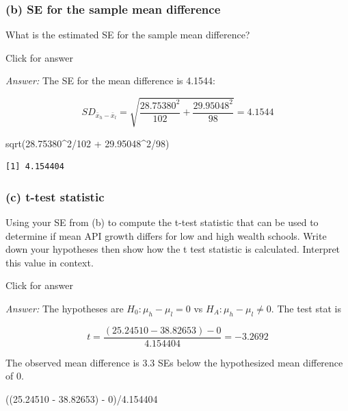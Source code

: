 \documentclass[
]{book}
\newenvironment{Shaded}{\begin{snugshade}}{\end{snugshade}}
\newcommand{\DecValTok}[1]{\textcolor[rgb]{0.00,0.00,0.81}{#1}}
\newcommand{\FloatTok}[1]{\textcolor[rgb]{0.00,0.00,0.81}{#1}}
\newcommand{\FunctionTok}[1]{\textcolor[rgb]{0.00,0.00,0.00}{#1}}
\newcommand{\NormalTok}[1]{#1}
\newcommand{\SpecialCharTok}[1]{\textcolor[rgb]{0.00,0.00,0.00}{#1}}
\begin{document}
\hypertarget{b-se-for-the-sample-mean-difference-1}{%
\subsubsection{(b) SE for the sample mean difference}\label{b-se-for-the-sample-mean-difference-1}}

What is the estimated SE for the sample mean difference?

Click for answer

\emph{Answer:} The SE for the mean difference is 4.1544:

\[
SD_{\bar{x}_h - \bar{x}_l} = \sqrt{\dfrac{28.75380^2}{102} + \dfrac{29.95048^2}{98}} = 4.1544
\]

\begin{Shaded}
\begin{Highlighting}[]
\FunctionTok{sqrt}\NormalTok{(}\FloatTok{28.75380}\SpecialCharTok{\^{}}\DecValTok{2}\SpecialCharTok{/}\DecValTok{102} \SpecialCharTok{+}  \FloatTok{29.95048}\SpecialCharTok{\^{}}\DecValTok{2}\SpecialCharTok{/}\DecValTok{98}\NormalTok{)}
\end{Highlighting}
\end{Shaded}

\begin{verbatim}
[1] 4.154404
\end{verbatim}

\hypertarget{c-t-test-statistic-3}{%
\subsubsection{(c) t-test statistic}\label{c-t-test-statistic-3}}

Using your SE from (b) to compute the t-test statistic that can be used to determine if mean API growth differs for low and high wealth schools. Write down your hypotheses then show how the t test statistic is calculated. Interpret this value in context.

Click for answer

\emph{Answer:} The hypotheses are \(H_0: \mu_h - \mu_l = 0\) vs \(H_A: \mu_h - \mu_l \neq 0\). The test stat is

\[
t = \dfrac{(25.24510 - 38.82653) - 0}{4.154404} = -3.2692
\]

The observed mean difference is 3.3 SEs below the hypothesized mean difference of 0.

\begin{Shaded}
\begin{Highlighting}[]
\NormalTok{((}\FloatTok{25.24510} \SpecialCharTok{{-}} \FloatTok{38.82653}\NormalTok{) }\SpecialCharTok{{-}} \DecValTok{0}\NormalTok{)}\SpecialCharTok{/}\FloatTok{4.154404} 
\end{Highlighting}
\end{Shaded}
\end{document}
